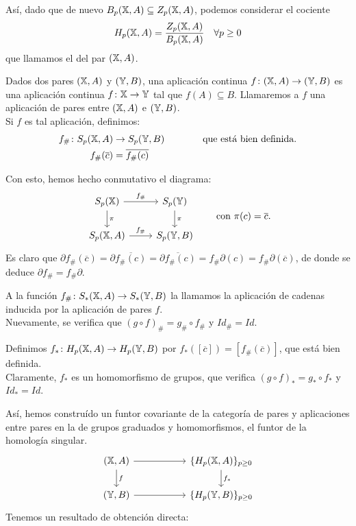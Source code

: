 Así, dado que de nuevo $B_p({\mathbb X}, A) \subseteq Z_p({\mathbb X}, A)$, podemos considerar el cociente
\[H_p({\mathbb X}, A) = \frac{Z_p({\mathbb X}, A)}{B_p({\mathbb X}, A)} \quad \forall p \geq 0 \]
que llamamos el \textbf{\underline{}} del par $({\mathbb X}, A)$.

Dados dos pares $({\mathbb X}, A)$ y $({\mathbb Y}, B)$, una aplicación continua $f \colon ({\mathbb X}, A) \to ({\mathbb Y}, B)$ es una aplicación continua
$f \colon {\mathbb X} \to {\mathbb Y}$ tal que $f(A) \subseteq B$. Llamaremos a $f$ una aplicación de pares entre $({\mathbb X}, A)$ e $({\mathbb Y}, B)$. \\
Si $f$ es tal aplicación, definimos:
\begin{align*}
  f_\# \colon S_p({\mathbb X}, A) &\to S_p({\mathbb Y}, B) \hspace{4em} \text{que está bien definida.} \\
  f_\#(\overline{c}) &= \overline{f_\#(c)}
\end{align*}

Con esto, hemos hecho conmutativo el diagrama:
\[
\begin{tikzcd}
    S_p(\X) \arrow{r}{f_\#} \arrow{d}{\pi} & S_p(\Y) \arrow{d}{\pi} \\
    S_p(\X, A) \arrow{r}{f_\#} & S_p(\Y, B)
  \end{tikzcd}
  \hspace{2em} \text{con } \pi(c) = \overline{c}.
\]
Es claro que $\partial f_\#(\overline{c}) = \partial \overline{f_\#(c)} = \overline{\partial f_\#(c)} = f_\# \partial(c) = f_\# \partial(\overline{c})$,
de donde se deduce $\partial f_\# = f_\# \partial$.

A la función $f_\# \colon S_*({\mathbb X}, A) \to S_*({\mathbb Y}, B)$ la llamamos la aplicación de cadenas inducida por la aplicación de pares $f$. \\
Nuevamente, se verifica que $(g \circ f)_\# = g_\# \circ f_\#$ y $Id_\# = Id$.

Definimos $f_* \colon H_p({\mathbb X}, A) \to H_p({\mathbb Y}, B)$ por $f_*([\overline{c}]) = [f_\#(\overline{c})]$, que está bien definida. \\
Claramente, $f_*$ es un homomorfismo de grupos, que verifica $(g \circ f)_* = g_* \circ f_*$ y $Id_* = Id$.

Así, hemos construído un funtor covariante de la categoría de pares y aplicaciones entre pares en la de grupos graduados y homomorfismos,
el funtor de la homología singular.
\[
\begin{tikzcd}
  (\X, A) \arrow{r} \arrow{d}{f} & [3em] \{H_p(\X, A)\}_{p \geq 0} \arrow{d}{f_*} \\
  (\Y, B) \arrow{r} & \{H_p(\Y, B)\}_{p \geq 0}
\end{tikzcd}
\]
Tenemos un resultado de obtención directa:

